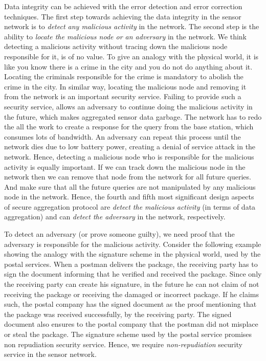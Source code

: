 	Data integrity can be achieved with the error detection and error correction techniques.
	The first step towards achieving the data integrity in the sensor network is to \textit{detect any malicious activity} in the network.
	The second step is the ability to \textit{locate the malicious node or an adversary} in the network.
	We think detecting a malicious activity without tracing down the malicious node responsible for it, is of no value.
	To give an analogy with the physical world, it is like you know there is a crime in the city and you do not do anything about it.
	Locating the criminals responsible for the crime is mandatory to abolish the crime in the city.
	In similar way, locating the malicious node and removing it from the network is an important security service. 
	Failing to provide such a security service, allows an adversary to continue doing the malicious activity in the future, which makes aggregated sensor data garbage. 
	The network has to redo the all the work to create a response for the query from the base station, which consumes lots of bandwidth. 
	An adversary can repeat this process until the network dies due to low battery power, creating a denial of service attack in the network.
	Hence, detecting a malicious node who is responsible for the malicious activity is equally important.
	If we can track down the malicious node in the network then we can remove that node from the network for all future queries.
	And make sure that all the future queries are not manipulated by any malicious node in the network.
	Hence, the fourth and fifth most significant design aspects of secure aggregation protocol are \textit{detect the malicious activity} (in terms of data aggregation) and can \textit{detect the adversary} in the network, respectively.

	To detect an adversary (or prove someone guilty), we need proof that the adversary is responsible for the malicious activity.	 
	Consider the following example showing the analogy with the signature scheme in the physical world, used by the postal services.
	When a postman delivers the package, the receiving party has to sign the document informing that he verified and received the package.
	Since only the receiving party can create his signature, in the future he can not claim of not receiving the package or receiving the damaged or incorrect package. 
	If he claims such, the postal company has the signed document as the proof mentioning that the package was received successfully, by the receiving party.
	The signed document also ensures to the postal company that the postman did not misplace or steal the package.
	The signature scheme used by the postal service promises non repudiation security service.
	Hence, we require \textit{non-repudiation} security service in the sensor network.

